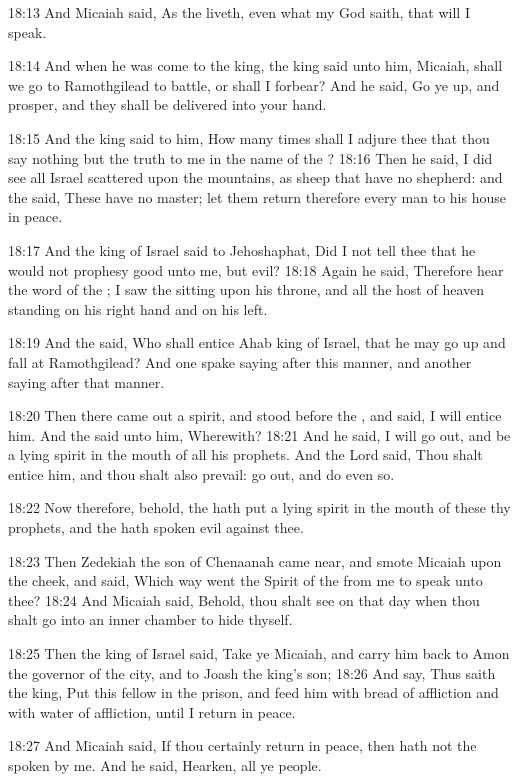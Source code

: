 18:13 And Micaiah said, As the \LORD liveth, even what my God saith,
that will I speak.

18:14 And when he was come to the king, the king said unto him,
Micaiah, shall we go to Ramothgilead to battle, or shall I forbear?
And he said, Go ye up, and prosper, and they shall be delivered into
your hand.

18:15 And the king said to him, How many times shall I adjure thee
that thou say nothing but the truth to me in the name of the \LORD?
18:16 Then he said, I did see all Israel scattered upon the mountains,
as sheep that have no shepherd: and the \LORD said, These have no
master; let them return therefore every man to his house in peace.

18:17 And the king of Israel said to Jehoshaphat, Did I not tell thee
that he would not prophesy good unto me, but evil?  18:18 Again he
said, Therefore hear the word of the \LORD; I saw the \LORD sitting upon
his throne, and all the host of heaven standing on his right hand and
on his left.

18:19 And the \LORD said, Who shall entice Ahab king of Israel, that he
may go up and fall at Ramothgilead? And one spake saying after this
manner, and another saying after that manner.

18:20 Then there came out a spirit, and stood before the \LORD, and
said, I will entice him. And the \LORD said unto him, Wherewith?  18:21
And he said, I will go out, and be a lying spirit in the mouth of all
his prophets. And the Lord said, Thou shalt entice him, and thou shalt
also prevail: go out, and do even so.

18:22 Now therefore, behold, the \LORD hath put a lying spirit in the
mouth of these thy prophets, and the \LORD hath spoken evil against
thee.

18:23 Then Zedekiah the son of Chenaanah came near, and smote Micaiah
upon the cheek, and said, Which way went the Spirit of the \LORD from
me to speak unto thee?  18:24 And Micaiah said, Behold, thou shalt see
on that day when thou shalt go into an inner chamber to hide thyself.

18:25 Then the king of Israel said, Take ye Micaiah, and carry him
back to Amon the governor of the city, and to Joash the king's son;
18:26 And say, Thus saith the king, Put this fellow in the prison, and
feed him with bread of affliction and with water of affliction, until
I return in peace.

18:27 And Micaiah said, If thou certainly return in peace, then hath
not the \LORD spoken by me. And he said, Hearken, all ye people.

